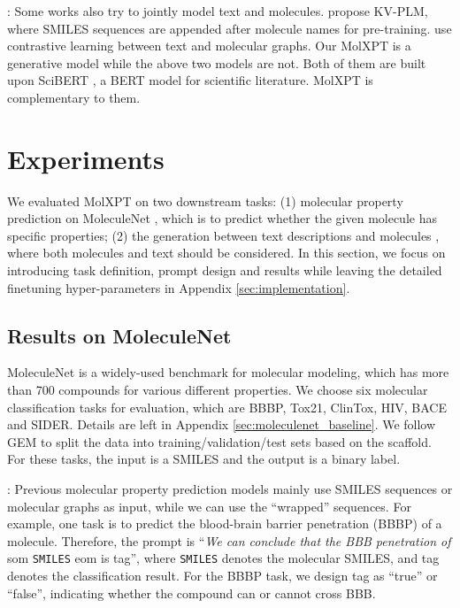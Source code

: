 \documentclass[11pt]{article}
\newcommand{\ourM}{MolXPT}
\newcommand{\som}{som}
\newcommand{\eom}{eom}
\begin{document}
: Some  works also try to jointly model text and molecules. \citet{Zeng2022KV-PLM} propose KV-PLM, where SMILES sequences are appended after molecule names for pre-training. \citet{su2022molecular} use contrastive learning between  text and molecular graphs. Our \ourM{} is a generative model while the above two models are not. Both of them are built upon SciBERT \citep{beltagy-etal-2019-scibert}, a BERT model \cite{devlin-etal-2019-bert} for scientific literature. \ourM{} is complementary to them.

\section{Experiments}
We evaluated \ourM{} on two downstream tasks: (1) molecular property prediction on MoleculeNet \cite{moleculenet}, which is to predict whether the given molecule has specific properties;
(2) the generation between text descriptions and molecules \cite{molt5}, where both molecules and text should be considered. In this section, we focus on introducing task definition, prompt design and results while leaving the detailed finetuning hyper-parameters in Appendix \ref{sec:implementation}.

\subsection{Results on MoleculeNet}
\label{sec:pubmedqa_exp}

MoleculeNet \cite{moleculenet} is a widely-used benchmark for molecular modeling, which has more than 700 compounds for various different properties. We choose six molecular classification tasks for evaluation, which are BBBP, Tox21, ClinTox, HIV, BACE and SIDER. Details are left in Appendix \ref{sec:moleculenet_baseline}.
We follow GEM \citep{fang2022geometry} to split the data into training/validation/test sets based on the scaffold. For these tasks, the input is a SMILES and the output is a binary label. 

: Previous molecular property prediction models mainly use SMILES sequences or molecular graphs as input, while we can use the ``wrapped'' sequences. For example, one task is to predict the blood-brain barrier penetration (BBBP) of a molecule. Therefore, the prompt is ``{\em We can conclude that the BBB penetration of }\som{} \texttt{SMILES} \eom{} is tag'', where \texttt{SMILES} denotes the molecular SMILES, and tag denotes the classification result. For the BBBP task, we design tag as ``true'' or ``false'', indicating whether the compound can or cannot cross BBB.  
\end{document}
